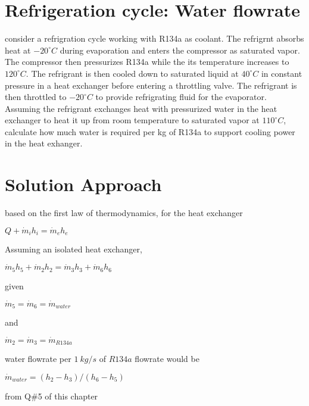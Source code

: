 \documentclass[letterpaper,10pt,english]{jupyterBook}
\begin{document}
\section{Refrigeration cycle: Water flow\sphinxhyphen{}rate}
\label{\detokenize{notebooks/Chapter5/CH5-Q7:refrigeration-cycle-water-flow-rate}}\label{\detokenize{notebooks/Chapter5/CH5-Q7::doc}}
\sphinxAtStartPar
consider a refrigration cycle working with R134\sphinxhyphen{}a as coolant. The refrigrnt absorbs heat at \(-20 ^{\circ}  C\) during evaporation and enters the compressor as saturated vapor. The compressor then pressurizes R134\sphinxhyphen{}a while the its temperature increases to \(120 ^{\circ}  C\). The refrigrant is then cooled down to saturated liquid at \(40 ^{\circ}  C\) in constant pressure in a heat exchanger before entering a throttling valve. The refrigrant is then throttled to \(-20 ^{\circ}  C\) to provide refrigrating fluid for the evaporator. Assuming the refrigrant exchanges heat with pressurized water in the heat exchanger to heat it up from room temperature to saturated vapor at \(110 ^{\circ}  C\), calculate how much water is required per kg of R134a to support cooling power in the heat exhanger.

\sphinxAtStartPar
{}


\section{Solution Approach}
\label{\detokenize{notebooks/Chapter5/CH5-Q7:solution-approach}}
\sphinxAtStartPar
based on the first law of thermodynamics, for the heat exchanger

\sphinxAtStartPar
\(Q+\dot m_ih_i=\dot m_eh_e\)

\sphinxAtStartPar
Assuming an isolated heat exchanger,

\sphinxAtStartPar
\(\dot m_5h_5+\dot m_2h_2=\dot m_3h_3+\dot m_6h_6\)

\sphinxAtStartPar
given

\sphinxAtStartPar
\(\dot m_5=\dot m_6=\dot m_{water}\)

\sphinxAtStartPar
and

\sphinxAtStartPar
\(\dot m_2=\dot m_3=\dot m_{R134a}\)

\sphinxAtStartPar
water flow\sphinxhyphen{}rate per \(1\:kg/s\) of \(R134a\) flow\sphinxhyphen{}rate would be

\sphinxAtStartPar
\(\dot m_{water}=(h_2-h_3)/(h_6-h_5)\)

\sphinxAtStartPar
from Q\#5 of this chapter
\end{document}
